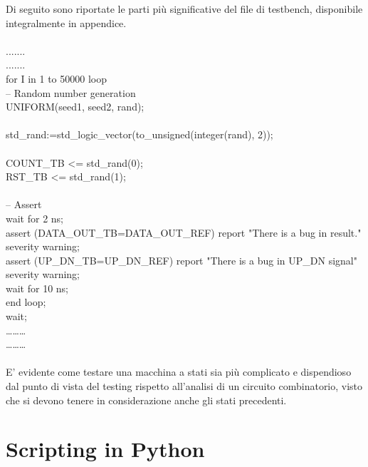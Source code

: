 Di seguito sono riportate le parti più significative del file di testbench, disponibile         integralmente in appendice.\\
\\
.......\\
.......\\
for I in 1 to 50000 loop\\
-- Random number generation\\
UNIFORM(seed1, seed2, rand);\\
\\
std\_rand:=std\_logic\_vector(to\_unsigned(integer(rand), 2));\\
\\
COUNT\_TB    <= std\_rand(0);\\
RST\_TB    <= std\_rand(1); \\
\\
-- Assert\\
wait for 2 ns;\\
assert (DATA\_OUT\_TB=DATA\_OUT\_REF) report "There is a bug in result." severity warning;\\
assert (UP\_DN\_TB=UP\_DN\_REF) report "There is a bug in UP\_DN signal" severity warning;\\
wait for 10 ns;\\
end loop;\\
wait;\\
………\\
………\\
\\
E' evidente come testare una macchina a stati sia più complicato e dispendioso dal punto di vista del testing rispetto all'analisi di un circuito combinatorio, visto che si devono tenere in considerazione anche gli stati precedenti.\\ 
\section{Scripting in Python}
